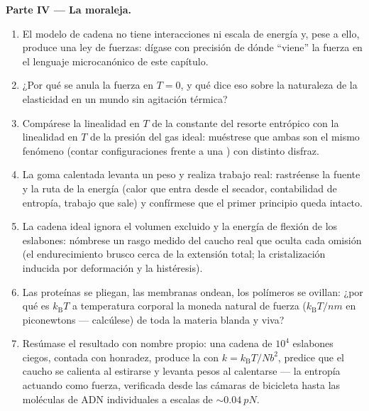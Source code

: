 \begin{problem}
\medskip\noindent\textbf{Parte IV --- La moraleja.}
\begin{enumerate}[resume]
  \item El modelo de cadena no tiene interacciones ni escala de energía y,
        pese a ello, produce una ley de fuerzas: dígase con precisión de
        dónde ``viene'' la fuerza en el lenguaje microcanónico de este
        capítulo.
  \item ¿Por qué se anula la fuerza en $T = 0$, y qué dice eso
        sobre la naturaleza de la elasticidad en un mundo sin agitación
        térmica?
  \item Compárese la linealidad en $T$ de la constante del resorte entrópico
        con la linealidad en $T$ de la presión del gas ideal: muéstrese que
        ambas son el mismo fenómeno (contar configuraciones frente a una
        ) con distinto disfraz.
  \item La goma calentada levanta un peso y realiza trabajo real: rastréense
        la fuente y la ruta de la energía (calor que entra desde el
        secador, contabilidad de entropía, trabajo que sale) y confírmese que
        el primer principio queda intacto.
  \item La cadena ideal ignora el volumen excluido y la energía de flexión
        de los eslabones: nómbrese un rasgo medido del caucho real que oculta
        cada omisión (el endurecimiento brusco cerca de la extensión total;
        la cristalización inducida por deformación y la histéresis).
  \item Las proteínas se pliegan, las membranas ondean, los polímeros se
        ovillan: ¿por qué es $k_{\text{B}}T$ a temperatura corporal la
        moneda natural de fuerza ($k_{\text{B}}T/\unit{nm}$ en
        piconewtons --- calcúlese) de toda la materia blanda y viva?
  \item Resúmase el resultado con nombre propio: una cadena de $10^4$
        eslabones ciegos, contada con honradez, produce la 
        con $k =
        k_{\text{B}}T/Nb^2$, predice que el caucho se calienta al
        estirarse y levanta pesos al calentarse --- la entropía actuando
        como fuerza, verificada desde las cámaras de bicicleta hasta las
        moléculas de ADN individuales a escalas de $\sim\qty{0.04}{pN}$.
\end{enumerate}
\end{problem}
